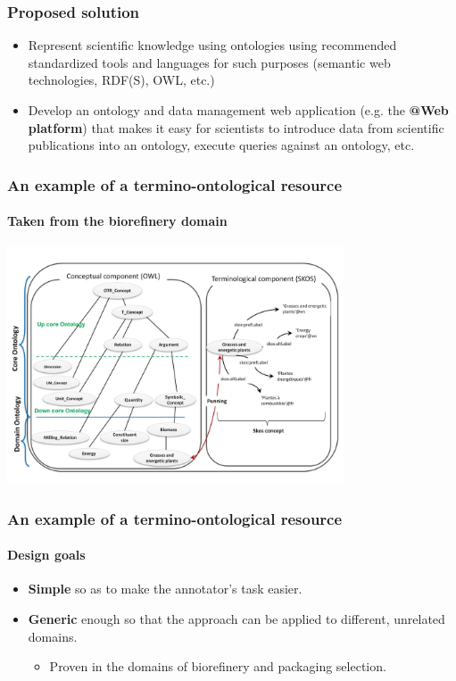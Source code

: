 \documentclass{beamer}
\begin{document}
\begin{frame}
  \frametitle{Proposed solution}

  \begin{itemize}
    \item Represent scientific knowledge using ontologies using recommended standardized tools and languages for such purposes (semantic web technologies, RDF(S), OWL, etc.)

    \pause

    \item Develop an ontology and data management web application (e.g. the \textbf{@Web platform}) that makes it easy for scientists to introduce data from scientific publications into an ontology, execute queries against an ontology, etc.
  \end{itemize}
\end{frame}

\begin{frame}
  \frametitle{An example of a termino-ontological resource}
  \framesubtitle{Taken from the biorefinery domain}

  \begin{center}
    \includegraphics[width=10cm]{termino-ontological-resource.jpg}
  \end{center}
\end{frame}

\begin{frame}
  \frametitle{An example of a termino-ontological resource}
  \framesubtitle{Design goals}

  \begin{itemize}
    \item \textbf{Simple} so as to make the annotator's task easier.

    \pause

    \item \textbf{Generic} enough so that the approach can be applied to different, unrelated domains.

    \pause

    \begin{itemize}
      \item Proven in the domains of biorefinery and packaging selection.
    \end{itemize}
  \end{itemize}
\end{frame}
\end{document}
